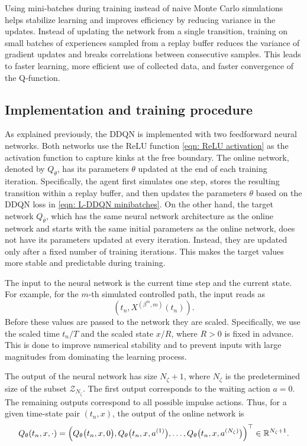 Using mini‑batches during training instead of naive Monte Carlo simulations helps stabilize learning and improves efficiency by reducing variance in the updates. Instead of updating the network from a single transition, training on small batches of experiences sampled from a replay buffer reduces the variance of gradient updates and breaks correlations between consecutive samples. This leads to faster learning, more efficient use of collected data, and faster convergence of the Q‑function.

\subsection{Implementation and training procedure}
As explained previously, the DDQN is implemented with two feedforward neural networks. Both networks use the ReLU function \eqref{eqn: ReLU activation} as the activation function to capture kinks at the free boundary. The online network, denoted by $Q_\theta$, has its parameters $\theta$ updated at the end of each training iteration. Specifically, the agent first simulates one step, stores the resulting transition within a replay buffer, and then updates the parameters $\theta$ based on the DDQN loss in \eqref{eqn: L-DDQN minibatches}. On the other hand, the target network $Q_{\bar \theta}$, which has the same neural network architecture as the online network and starts with the same initial parameters as the online network, does not have its parameters updated at every iteration. Instead, they are updated only after a fixed number of training iterations. This makes the target values more stable and predictable during training. 

The input to the neural network is the current time step and the current state. For example, for the $m$-th simulated controlled path, the input reads as
\begin{equation*}
    (t_n, X^{(\beta^m,m)}(t_n)). 
\end{equation*}
Before these values are passed to the network they are scaled. Specifically, we use the scaled time $t_n/T$ and the scaled state $x/R$, where $R>0$ is fixed in advance. This is done to improve numerical stability and to prevent inputs with large magnitudes from dominating the learning process.

The output of the neural network has size $N_\zeta+1$, where $N_\zeta$ is the predetermined size of the subset $\mathcal{Z}_{N_\zeta}$. The first output corresponds to the waiting action $a=0$. The remaining outputs correspond to all possible impulse actions. Thus, for a given time-state pair $(t_n,x)$, the output of the online network is
\begin{equation}
    Q_\theta(t_n,x,\cdot) = \left( Q_\theta\big(t_n,x,0\big), Q_\theta\big(t_n,x,a^{(1)}\big), \ldots, Q_\theta\big(t_n,x,a^{(N_\zeta)}\big)  \right)^\top \in \mathbb{R}^{N_\zeta + 1}.
    \label{eqn: Q output vector}
\end{equation}

